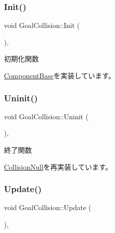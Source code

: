 \subsubsection{\texorpdfstring{Init()}{Init()}}
{\footnotesize\ttfamily void Goal\+Collision\+::\+Init (\begin{DoxyParamCaption}{ }\end{DoxyParamCaption})\hspace{0.3cm}{\ttfamily [override]}, {\ttfamily [virtual]}}



初期化関数 



\mbox{\hyperlink{class_component_base_a125939d6befe42f28886a6523e86b18b}{Component\+Base}}を実装しています。

\mbox{\label{class_goal_collision_ab818bad44ffcd595f1c495e659c0b348}} 
\subsubsection{\texorpdfstring{Uninit()}{Uninit()}}
{\footnotesize\ttfamily void Goal\+Collision\+::\+Uninit (\begin{DoxyParamCaption}{ }\end{DoxyParamCaption})\hspace{0.3cm}{\ttfamily [override]}, {\ttfamily [virtual]}}



終了関数 



\mbox{\hyperlink{class_collision_null_a7c6d0ec502efc55e2f406415451152f5}{Collision\+Null}}を再実装しています。

\mbox{\label{class_goal_collision_a1e3995dc2f5ba2678580d06699ca6936}} 
\subsubsection{\texorpdfstring{Update()}{Update()}}
{\footnotesize\ttfamily void Goal\+Collision\+::\+Update (\begin{DoxyParamCaption}{ }\end{DoxyParamCaption})\hspace{0.3cm}{\ttfamily [override]}, {\ttfamily [virtual]}}



